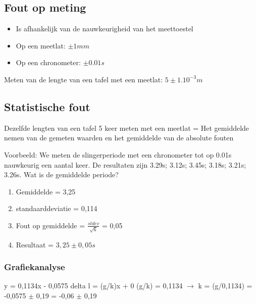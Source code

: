 \documentclass[12pt]{report}
\begin{document}
\subsection{Fout op meting}
\begin{itemize}
 \item Is afhankelijk van de nauwkeurigheid van het meettoestel
 \item Op een meetlat: $\pm 1mm$
 \item Op een chronometer: $\pm 0.01s$
\end{itemize}
Meten van de lengte van een tafel met een meetlat: $5 \pm 1.10^{-3} m$ 

\subsection{Statistische fout}

Dezelfde lengten van een tafel 5 keer meten met een meetlat = 
Het gemiddelde nemen van de gemeten waarden en het gemiddelde van de absolute
fouten

Voorbeeld: We meten de slingerperiode met een chronometer tot op 0.01s nauwkeurig een 
aantal keer. De resultaten zijn 3.29s; 3.12s; 3.45s; 3.18s; 3.21s; 3.26s.
Wat is de gemiddelde periode?
\begin{enumerate}
 \item Gemiddelde = 3,25
 \item standaarddeviatie = 0,114
 \item Fout op gemiddelde = $\frac{stdev}{\sqrt{6}}$ = 0,05
 \item Resultaat = $3,25 \pm 0,05 s$
\end{enumerate}


\subsubsection{Grafiekanalyse}
y = 0,1134x - 0,0575
\newline
delta l = (g/k)x + 0
\newline
(g/k) = 0,1134 $\rightarrow$ k = (g/0,1134)
 = -0,0575 $\pm$ 0,19
 = -0,06 $\pm$ 0,19
\end{document}
